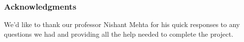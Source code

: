\documentclass{article}
\begin{document}
\FloatBarrier


\subsubsection*{Acknowledgments}

We'd like to thank our professor Nishant Mehta for his quick responses to any
questions we had and providing all the help needed to complete the project.

\newpage


% 



\end{document}

